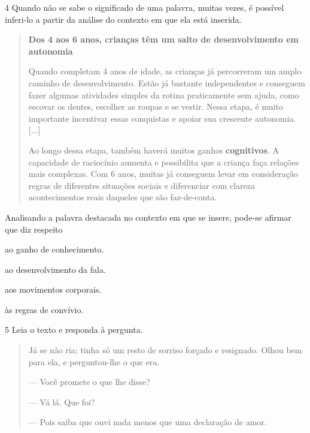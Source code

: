 \pagebreak
\num{4} Quando não se sabe o significado de uma palavra, muitas vezes, é
possível inferi-lo a partir da análise do contexto em que ela está
inserida.

\begin{quote}
\textbf{Dos 4 aos 6 anos, crianças têm um salto de desenvolvimento em autonomia}

Quando completam 4 anos de idade, as crianças já percorreram um amplo
caminho de desenvolvimento. Estão já bastante independentes e conseguem
fazer algumas atividades simples da rotina praticamente sem ajuda, como
escovar os dentes, escolher as roupas e se vestir. Nessa etapa, é muito
importante incentivar essas conquistas e apoiar sua crescente autonomia.
{[}...{]}

Ao longo dessa etapa, também haverá muitos ganhos \textbf{cognitivos}. A
capacidade de raciocínio aumenta e possibilita que a criança faça
relações mais complexas. Com 6 anos, muitas já conseguem levar em
consideração regras de diferentes situações sociais e diferenciar com
clareza acontecimentos reais daqueles que são faz-de-conta.

\end{quote}

Analisando a palavra destacada no contexto em que se insere, 
pode-se afirmar que diz respeito

\begin{escolha}
\item ao ganho de conhecimento.

\item ao desenvolvimento da fala.

\item aos movimentos corporais.

\item às regras de convívio.
\end{escolha}

\pagebreak
\num{5} Leia o texto e responda à pergunta.

\begin{quote}
Já se não ria; tinha só um resto de sorriso forçado e resignado. Olhou
bem para ela, e perguntou-lhe o que era.

--- Você promete o que lhe disse?

--- Vá lá. Que foi?

--- Pois saiba que ouvi nada menos que uma declaração de amor.

\end{quote}


